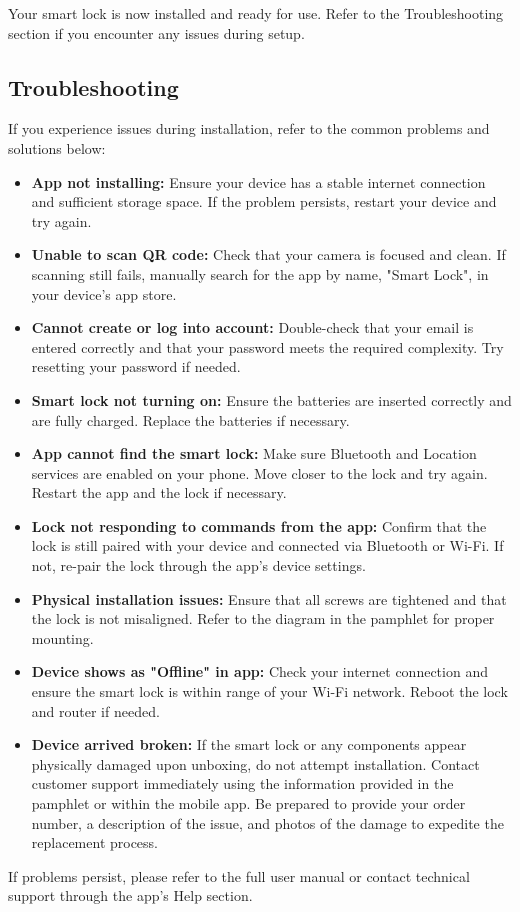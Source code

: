 Your smart lock is now installed and ready for use. Refer to the Troubleshooting section if you encounter any issues during setup.

\subsection{Troubleshooting}

If you experience issues during installation, refer to the common problems and solutions below:

\begin{itemize}
    \item \textbf{App not installing:}  
    Ensure your device has a stable internet connection and sufficient storage space. If the problem persists, restart your device and try again.

    \item \textbf{Unable to scan QR code:}  
    Check that your camera is focused and clean. If scanning still fails, manually search for the app by name, "Smart Lock", in your device’s app store.

    \item \textbf{Cannot create or log into account:}  
    Double-check that your email is entered correctly and that your password meets the required complexity. Try resetting your password if needed.

    \item \textbf{Smart lock not turning on:}  
    Ensure the batteries are inserted correctly and are fully charged. Replace the batteries if necessary.

    \item \textbf{App cannot find the smart lock:}  
    Make sure Bluetooth and Location services are enabled on your phone. Move closer to the lock and try again. Restart the app and the lock if necessary.

    \item \textbf{Lock not responding to commands from the app:}  
    Confirm that the lock is still paired with your device and connected via Bluetooth or Wi-Fi. If not, re-pair the lock through the app’s device settings.

    \item \textbf{Physical installation issues:}  
    Ensure that all screws are tightened and that the lock is not misaligned. Refer to the diagram in the pamphlet for proper mounting.

    \item \textbf{Device shows as "Offline" in app:}  
    Check your internet connection and ensure the smart lock is within range of your Wi-Fi network. Reboot the lock and router if needed.

    \item \textbf{Device arrived broken:}  
    If the smart lock or any components appear physically damaged upon unboxing, do not attempt installation. Contact customer support immediately using the information provided in the pamphlet or within the mobile app. Be prepared to provide your order number, a description of the issue, and photos of the damage to expedite the replacement process.

\end{itemize}

If problems persist, please refer to the full user manual or contact technical support through the app’s Help section.
